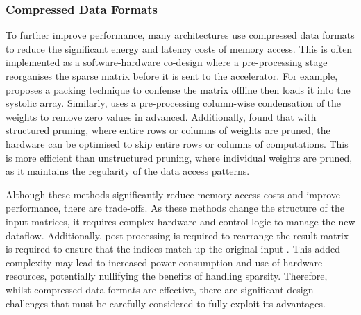 \documentclass[12pt, a4paper, ukenglish]{article}
\begin{document}
        \subsubsection{Compressed Data Formats} \label{sec: compressed}
        To further improve performance, many architectures use compressed data formats to reduce the significant energy and latency costs of memory access. This is often implemented as a software-hardware co-design where a pre-processing stage reorganises the sparse matrix before it is sent to the accelerator. For example, \textcite{he_sparse-tpu_2020} proposes a packing technique to confense the matrix offline then loads it into the systolic array. Similarly, \textcite{seo_versa_2024} uses a pre-processing column-wise condensation of the weights to remove zero values in advanced. Additionally, \textcite{palacios_systolic_2025,kim_fpga_2021} found that with structured pruning, where entire rows or columns of weights are pruned, the hardware can be optimised to skip entire rows or columns of computations. This is more efficient than unstructured pruning, where individual weights are pruned, as it maintains the regularity of the data access patterns. 

        Although these methods significantly reduce memory access costs and improve performance, there are trade-offs. As these methods change the structure of the input matrices, it requires complex hardware and control logic to manage the new dataflow. Additionally, post-processing is required to rearrange the result matrix is required to ensure that the indices match up the original input \textcite{seo_versa_2024}. This added complexity may lead to increased power consumption and use of hardware resources, potentially nullifying the benefits of handling sparsity. Therefore, whilst compressed data formats are effective, there are significant design challenges that must be carefully considered to fully exploit its advantages.


\end{document}
